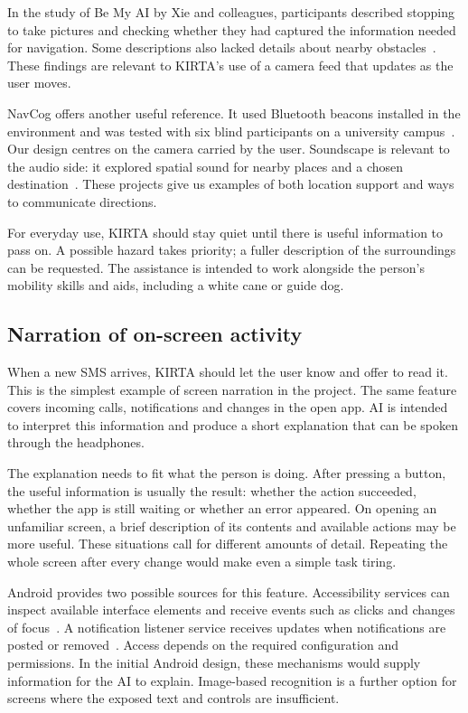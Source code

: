 \documentclass[10pt,twoside,english,a4paper]{article}
\begin{document}
In the study of Be My AI by Xie and colleagues, participants described stopping to take pictures and checking whether they had captured the information needed for navigation. Some descriptions also lacked details about nearby obstacles~\cite{xie2025}. These findings are relevant to KIRTA's use of a camera feed that updates as the user moves.

NavCog offers another useful reference. It used Bluetooth beacons installed in the environment and was tested with six blind participants on a university campus~\cite{navcog2016}. Our design centres on the camera carried by the user. Soundscape is relevant to the audio side: it explored spatial sound for nearby places and a chosen destination~\cite{soundscape}. These projects give us examples of both location support and ways to communicate directions.

For everyday use, KIRTA should stay quiet until there is useful information to pass on. A possible hazard takes priority; a fuller description of the surroundings can be requested. The assistance is intended to work alongside the person's mobility skills and aids, including a white cane or guide dog.

\subsection*{Narration of on-screen activity}

When a new SMS arrives, KIRTA should let the user know and offer to read it. This is the simplest example of screen narration in the project. The same feature covers incoming calls, notifications and changes in the open app. AI is intended to interpret this information and produce a short explanation that can be spoken through the headphones.

The explanation needs to fit what the person is doing. After pressing a button, the useful information is usually the result: whether the action succeeded, whether the app is still waiting or whether an error appeared. On opening an unfamiliar screen, a brief description of its contents and available actions may be more useful. These situations call for different amounts of detail. Repeating the whole screen after every change would make even a simple task tiring.

Android provides two possible sources for this feature. Accessibility services can inspect available interface elements and receive events such as clicks and changes of focus~\cite{androidaccessibility}. A notification listener service receives updates when notifications are posted or removed~\cite{androidnotifications}. Access depends on the required configuration and permissions. In the initial Android design, these mechanisms would supply information for the AI to explain. Image-based recognition is a further option for screens where the exposed text and controls are insufficient.
\end{document}

